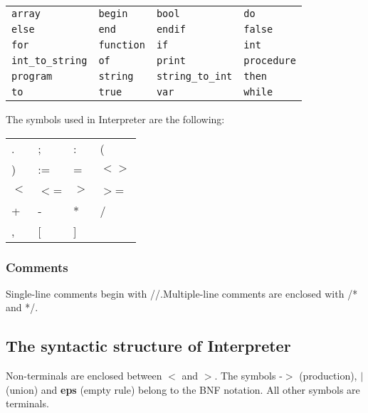 \documentclass{article}
\begin{document}
\begin{center}\begin{tabular}{llll}
\texttt{array} & \texttt{begin} & \texttt{bool} & \texttt{do} \\
\texttt{else} & \texttt{end} & \texttt{endif} & \texttt{false} \\
\texttt{for} & \texttt{function} & \texttt{if} & \texttt{int} \\
\texttt{int\_to\_string} & \texttt{of} & \texttt{print} & \texttt{procedure} \\
\texttt{program} & \texttt{string} & \texttt{string\_to\_int} & \texttt{then} \\
\texttt{to} & \texttt{true} & \texttt{var} & \texttt{while} \\
\end{tabular}\end{center}

The symbols used in Interpreter are the following:

\begin{center}\begin{tabular}{llll}
. & ; & : & ( \\
) & := & = & $<$$>$ \\
$<$ & $<$= & $>$ & $>$= \\
+ & - & * & / \\
, & [ & ] \\
\end{tabular}\end{center}

\subsubsection*{Comments}

Single-line comments begin with //.Multiple-line comments are  enclosed with /* and */.

\subsection*{The syntactic structure of Interpreter}

Non-terminals are enclosed between $<$ and $>$. 
The symbols -$>$ (production),  \textbf{$|$}  (union) 
and \textbf{eps} (empty rule) belong to the BNF notation. 
All other symbols are terminals.
\end{document}
